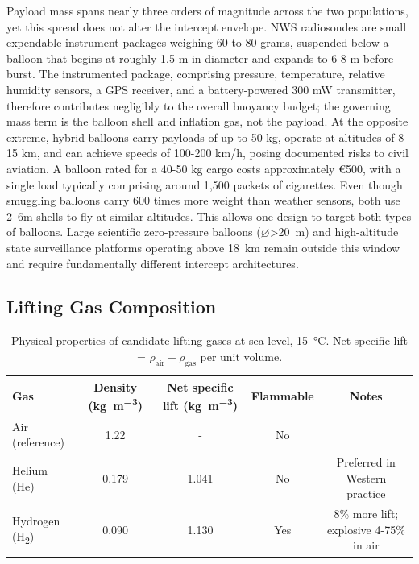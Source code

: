 Payload mass spans nearly three orders of magnitude across the two populations, yet this spread does not alter the intercept envelope. NWS radiosondes are small expendable instrument packages weighing 60 to 80 grams, suspended below a balloon that begins at roughly 1.5 m in diameter and expands to 6-8 m before burst. The instrumented package, comprising pressure, temperature, relative humidity sensors, a GPS receiver, and a battery-powered 300 mW transmitter, therefore contributes negligibly to the overall buoyancy budget; the governing mass term is the balloon shell and inflation gas, not the payload. At the opposite extreme, hybrid balloons carry payloads of up to 50 kg, operate at altitudes of 8-15 km, and can achieve speeds of 100-200 km/h, posing documented risks to civil aviation. A balloon rated for a 40-50 kg cargo costs approximately \euro{500}, with a single load typically comprising around 1{,}500 packets of cigarettes. Even though smuggling balloons carry 600 times more weight than weather sensors, both use 2–6m shells to fly at similar altitudes. This allows one design to target both types of balloons\cite{CounciloftheEuropeanUnion2025Belarus:States, RFE/RLBelarusService2025UpBoth, NOAANationalWeatherService2024RadiosondeSheet}.
Large scientific zero-pressure balloons ($\varnothing$\SI{>20}{\metre}) and high-altitude state surveillance platforms operating above \SI{18}{\kilo\metre} \cite{CNA2023HowWartime, NBCNews2023DownedSays} remain outside this window and require fundamentally different intercept architectures.


 
\vspace{-10pt}
\subsection{Lifting Gas Composition}
\label{subsec:lifting_gas}
 
\begin{table}[h!]
\centering
\caption{Physical properties of candidate lifting gases at sea level,
  \SI{15}{\degreeCelsius}.
  Net specific lift = $\rho_\text{air} - \rho_\text{gas}$ per unit volume.}
\label{tab:gas_props}
\small
\begin{tabular}{@{}lcccc@{}}
\toprule
\textbf{Gas} &
  \textbf{Density} (\si{\kilo\gram\per\metre\cubed}) &
  \textbf{Net specific lift} (\si{\kilo\gram\per\metre\cubed}) &
  \textbf{Flammable} &
  \textbf{Notes} \\
\midrule
Air (reference) & 1.22  & -   & No  & \\
Helium (He)     & 0.179 & 1.041 & No  & Preferred in Western practice \\
Hydrogen (H\textsubscript{2}) & 0.090 & 1.130 & Yes & 8\% more lift; explosive 4-75\% in air \\
\bottomrule
\end{tabular}
\end{table}
 \vspace{-15pt}

